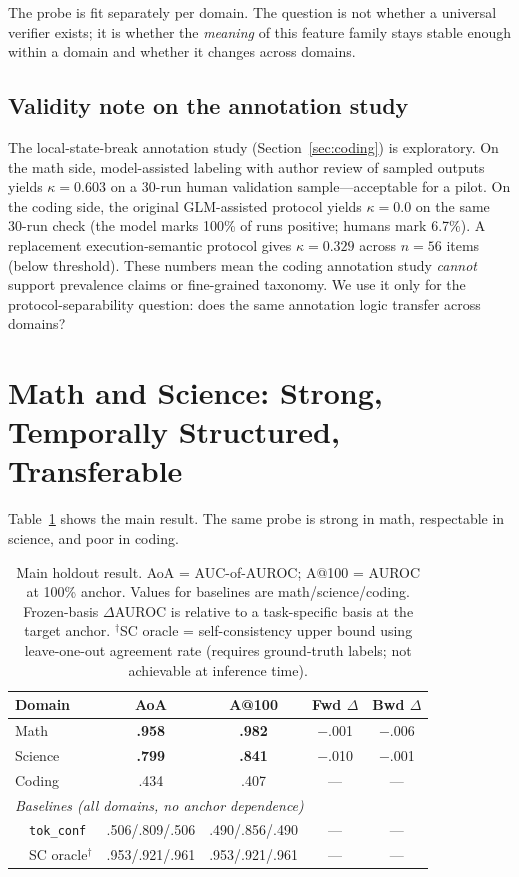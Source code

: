 \documentclass[10pt,twocolumn]{article}
\begin{document}
The probe is fit separately per domain. The question is not whether a universal verifier exists; it is whether the \emph{meaning} of this feature family stays stable enough within a domain and whether it changes across domains.

\subsection{Validity note on the annotation study}
\label{sec:validity}

The local-state-break annotation study (Section~\ref{sec:coding}) is exploratory. On the math side, model-assisted labeling with author review of sampled outputs yields $\kappa = 0.603$ on a 30-run human validation sample---acceptable for a pilot. On the coding side, the original GLM-assisted protocol yields $\kappa = 0.0$ on the same 30-run check (the model marks 100\% of runs positive; humans mark 6.7\%). A replacement execution-semantic protocol gives $\kappa = 0.329$ across $n = 56$ items (below threshold). These numbers mean the coding annotation study \emph{cannot} support prevalence claims or fine-grained taxonomy. We use it only for the protocol-separability question: does the same annotation logic transfer across domains?

\section{Math and Science: Strong, Temporally Structured, Transferable}

Table~\ref{tab:positive} shows the main result. The same probe is strong in math, respectable in science, and poor in coding.

\begin{table}[t]
\centering
\small
\begin{tabular}{lcccc}
\toprule
Domain & AoA & A@100 & Fwd $\Delta$ & Bwd $\Delta$ \\
\midrule
Math        & \textbf{.958} & \textbf{.982} & $-$.001 & $-$.006 \\
Science     & \textbf{.799} & \textbf{.841} & $-$.010 & $-$.001 \\
Coding      &  .434 &  .407 & --- & --- \\
\midrule
\multicolumn{5}{l}{\textit{Baselines (all domains, no anchor dependence)}} \\
\ \ \texttt{tok\_conf} & .506/.809/.506 & .490/.856/.490 & --- & --- \\
\ \ SC oracle$^\dagger$ & .953/.921/.961 & .953/.921/.961 & --- & --- \\
\bottomrule
\end{tabular}
\caption{Main holdout result. AoA = AUC-of-AUROC; A@100 = AUROC at 100\% anchor. Values for baselines are math/science/coding. Frozen-basis $\Delta$AUROC is relative to a task-specific basis at the target anchor. $^\dagger$SC oracle = self-consistency upper bound using leave-one-out agreement rate (requires ground-truth labels; not achievable at inference time).}
\label{tab:positive}
\end{table}
\end{document}
